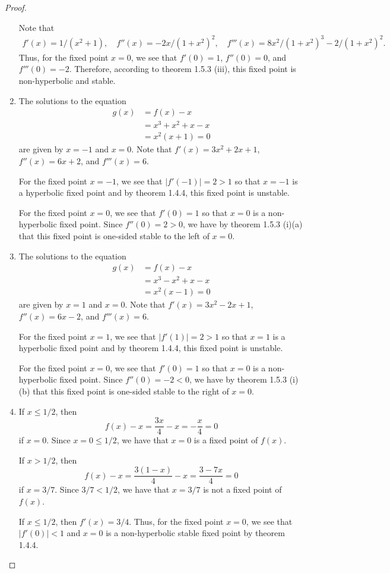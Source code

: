 \begin{proof}
\begin{enumerate}
      Note that
      \begin{align*}
        f'(x) = 1/(x^2+1), \quad f''(x) = -2 x/(1 + x^2)^2, \quad f'''(x) = 8 x^2/(1 + x^2)^3 - 2/(1 + x^2)^2.
      \end{align*}
      Thus, for the fixed point $x = 0$, we see that $f'(0) = 1$, $f''(0) = 0$, and $f'''(0) = -2$. Therefore,
      according to theorem 1.5.3 (iii), this fixed point is non-hyperbolic and stable.

    \item The solutions to the equation
      \begin{align*}
        g(x) &= f(x) - x \\
        &= x^3+x^2 + x - x \\
        &= x^2(x + 1) = 0
      \end{align*}
      are given by $x = -1$ and $x = 0$. Note that $f'(x) = 3x^2 + 2x + 1$,
      $f''(x) = 6x + 2$, and $f'''(x) = 6$.

      For the fixed point $x=-1$, we see that $|f'(-1)| = 2 > 1$ so that $x=-1$ is a hyperbolic fixed point
      and by theorem 1.4.4, this fixed point is unstable.

      For the fixed point $x=0$, we see that $f'(0) = 1$ so that $x=0$ is a non-hyperbolic fixed point.
      Since $f''(0) = 2 > 0$, we have by theorem 1.5.3 (i)(a) that this fixed point is one-sided stable to the left of $x=0$.

    \item The solutions to the equation
      \begin{align*}
        g(x) &= f(x) - x \\
        &= x^3-x^2 + x - x \\
        &= x^2(x - 1) = 0
      \end{align*}
      are given by $x = 1$ and $x = 0$. Note that $f'(x) = 3x^2 - 2x + 1$,
      $f''(x) = 6x - 2$, and $f'''(x) = 6$.

      For the fixed point $x=1$, we see that $|f'(1)| = 2 > 1$ so that $x=1$ is a hyperbolic fixed point
      and by theorem 1.4.4, this fixed point is unstable.

      For the fixed point $x=0$, we see that $f'(0) = 1$ so that $x=0$ is a non-hyperbolic fixed point.
      Since $f''(0) = - 2 < 0$, we have by theorem 1.5.3 (i)(b) that this fixed point is one-sided stable to the right of $x=0$.

    \item If $x\leq 1/2$, then
      $$f(x) -x = \frac{3x}{4} - x = -\frac{x}{4} = 0$$
      if $x=0$. Since $x = 0 \leq 1/2$, we have that $x=0$ is a fixed point of $f(x)$.

      If $x > 1/2$, then
      $$f(x) -x = \frac{3(1-x)}{4} - x = \frac{3 - 7 x}{4} = 0$$
      if $x=3/7$. Since $3/7 < 1/2$, we have that $x = 3/7$ is not a fixed point of $f(x)$.

      If $x \leq 1/2$, then $f'(x) = 3/4$. Thus, for the fixed point $x=0$, we see
      that $|f'(0)| < 1$ and $x=0$ is a non-hyperbolic stable fixed point by theorem 1.4.4.
  \end{enumerate}
\end{proof}
\newpage
